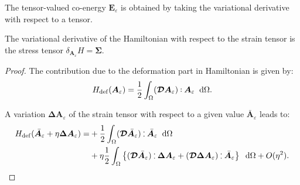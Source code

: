The tensor-valued co-energy $\bm{E}_\varepsilon$ is obtained by taking the variational derivative with respect to a tensor.
\begin{proposition}\label{prop:varder_tens}
	The variational derivative of the Hamiltonian with respect to the strain tensor is the stress tensor $\delta_{\bm{A}_{\varepsilon}}H = \bm{\Sigma}$.
	\begin{proof}
		The contribution due to the deformation part in Hamiltonian is given by:		\[H_{\mathrm{def}}(\bm{A}_{\varepsilon}) = \frac{1}{2} \int_{\Omega} (\bm{\mathcal{D}} \bm{A}_{\varepsilon}) \cddot \bm{A}_{\varepsilon}  \; \d\Omega. \]
	
		A variation $\bm{\Delta}\bm{A}_{\varepsilon}$ of the strain tensor with respect to a given value $\bar{\bm{A}}_{\varepsilon}$ leads to:
		\begin{align*}
		H_{\mathrm{def}}(\bar{\bm{A}}_{\varepsilon} + \eta \bm{\Delta}\bm{A}_{\varepsilon}) = &+\frac{1}{2} \int_{\Omega} (\bm{\mathcal{D}} \bar{\bm{A}}_{\varepsilon}) \cddot \bar{\bm{A}}_{\varepsilon} \; \d\Omega \\
		&+ \eta \frac{1}{2} \int_{\Omega} \left\{ (\bm{\mathcal{D}} \bar{\bm{A}}_{\varepsilon}) \cddot \bm{\Delta}\bm{A}_{\varepsilon}
		+ (\bm{\mathcal{D}} \bm{\Delta}\bm{A}_{\varepsilon}) \cddot \bar{\bm{A}}_{\varepsilon}\right\}\; \d\Omega  + O(\eta^2).
		\end{align*}


\end{proof}
\end{proposition}
